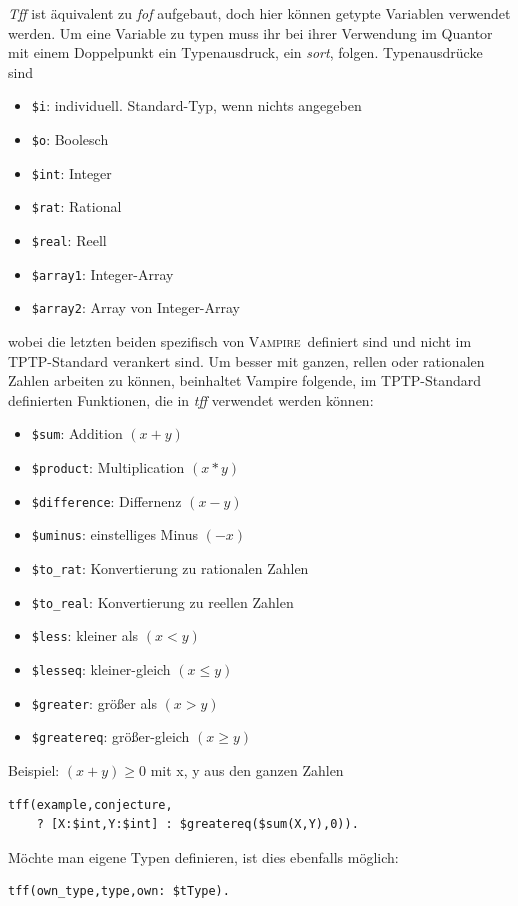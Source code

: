 \documentclass{article}
\newcommand{\vampire}{\textsc{Vampire}~}
\begin{document}
\textit{Tff} ist äquivalent zu \textit{fof} aufgebaut, doch hier können getypte Variablen verwendet werden. Um eine Variable zu typen muss ihr bei ihrer Verwendung im Quantor mit einem Doppelpunkt ein Typenausdruck, ein \textit{sort}, folgen.
Typenausdrücke sind \begin{itemize}
	\item \verb=$i=: individuell. Standard-Typ, wenn nichts angegeben
	\item \verb=$o=: Boolesch
	\item \verb=$int=: Integer
	\item \verb=$rat=: Rational
	\item \verb=$real=: Reell
	\item \verb=$array1=: Integer-Array
	\item \verb=$array2=: Array von Integer-Array
\end{itemize}
wobei die letzten beiden spezifisch von \vampire definiert sind und nicht im TPTP-Standard verankert sind.
Um besser mit ganzen, rellen oder rationalen Zahlen arbeiten zu können, beinhaltet Vampire folgende, im TPTP-Standard definierten Funktionen, die in \textit{tff} verwendet werden können:
\begin{itemize}
	\item \verb=$sum=: Addition $(x + y)$
	\item \verb=$product=: Multiplication $(x * y)$
	\item \verb=$difference=: Differnenz $(x - y)$
	\item \verb=$uminus=: einstelliges Minus $(-x)$
	\item \verb=$to_rat=: Konvertierung zu rationalen Zahlen
	\item \verb=$to_real=: Konvertierung zu reellen Zahlen
	\item \verb=$less=: kleiner als $(x < y)$
	\item \verb=$lesseq=: kleiner-gleich $(x \leq y)$
	\item \verb=$greater=: größer als $(x > y)$
	\item \verb=$greatereq=: größer-gleich $(x \geq y)$ 
\end{itemize}
Beispiel: $(x + y) \geq 0$ mit x, y aus den ganzen Zahlen
\begin{lstlisting}[language=tptp]
tff(example,conjecture, 
	? [X:$int,Y:$int] : $greatereq($sum(X,Y),0)).\end{lstlisting}
Möchte man eigene Typen definieren, ist dies ebenfalls möglich:
\begin{lstlisting}[language=tptp]
tff(own_type,type,own: $tType).
\end{lstlisting}
\end{document}
